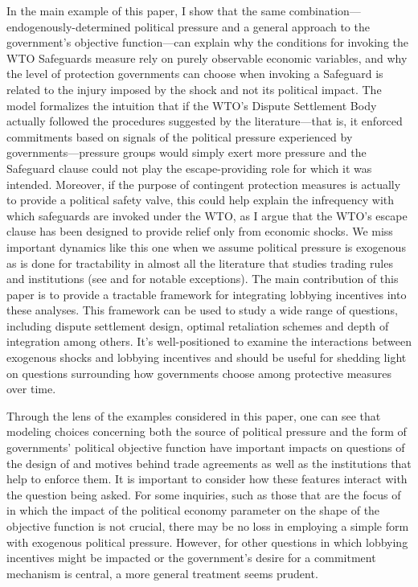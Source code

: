 In the main example of this paper, I show that the same combination---endogenously-determined political pressure and a general approach to the government's objective function---can explain why the conditions for invoking the WTO Safeguards measure rely on purely observable economic variables, and why the level of protection governments can choose when invoking a Safeguard is related to the injury imposed by the shock and not its political impact. The model formalizes the intuition that if the WTO's Dispute Settlement Body actually followed the procedures suggested by the literature---that is, it enforced commitments based on signals of the political pressure experienced by governments---pressure groups would simply exert more pressure and the Safeguard clause could not play the escape-providing role for which it was intended. Moreover, if the purpose of contingent protection measures is actually to provide a political safety valve, this could help explain the infrequency with which safeguards are invoked under the WTO, as I argue that the WTO's escape clause has been designed to provide relief only from economic shocks. We miss important dynamics like this one when we assume political pressure is exogenous as is done for tractability in almost all the literature that studies trading rules and institutions (see \Textcite{mrc2007} and \Textcite{lt} for notable exceptions). The main contribution of this paper is to provide a tractable framework for integrating lobbying incentives into these analyses. This framework can be used to study a wide range of questions, including dispute settlement design, optimal retaliation schemes and depth of integration among others. It's well-positioned to examine the interactions between exogenous shocks and lobbying incentives and should be useful for shedding light on questions surrounding how governments choose among protective measures over time.

Through the lens of the examples considered in this paper, one can see that modeling choices concerning both the source of political pressure and the form of governments' political objective function have important impacts on questions of the design of and motives behind trade agreements as well as the institutions that help to enforce them. It is important to consider how these features interact with the question being asked. For some inquiries, such as those that are the focus of \Textcite{ms2011, ms2012a} in which the impact of the political economy parameter on the shape of the objective function is not crucial, there may be no loss in employing a simple form with exogenous political pressure. However, for other questions in which lobbying incentives might be impacted or the government's desire for a commitment mechanism is central, a more general treatment seems prudent.

